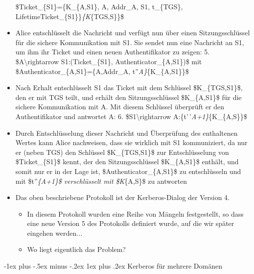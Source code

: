 \documentclass[a4paper]{article}
\makeatletter
\renewcommand{\subsubsection}{\@startsection{subsubsection}{3}{0mm}%
 {-1ex plus -.5ex minus -.2ex}%
 {1ex plus .2ex}%
 {\normalfont\small\bfseries}}
\makeatother
\begin{document}
\begin{multicols}{3}
\begin{itemize}
              \$Ticket\_\{S1\}=\{K\_\{A,S1\}, A, Addr\_A, S1, t\_\{TGS\},
              LifetimeTicket\_\{S1\}\}\emph{\{K}\{TGS,S\}\}\$
        \item
              Alice entschlüsselt die Nachricht und verfügt nun über einen
              Sitzungsschlüssel für die sichere Kommunikation mit S1. Sie sendet nun
              eine Nachricht an S1, um ihm ihr Ticket und einen neuen
              Authentifikator zu zeigen: 5. \$A\textbackslash rightarrow
              S1:(Ticket\_\{S1\}, Authenticator\_\{A,S1\})\$ mit
              \$Authenticator\_\{A,S1\}=\{A,Addr\_A, t''\emph{A\}}\{K\_\{A,S1\}\}\$
        \item
              Nach Erhalt entschlüsselt S1 das Ticket mit dem Schlüssel
              \$K\_\{TGS,S1\}\$, den er mit TGS teilt, und erhält den
              Sitzungsschlüssel \$K\_\{A,S1\}\$ für die sichere Kommunikation mit A.
              Mit diesem Schlüssel überprüft er den Authentifikator und antwortet A:
              6. \$S1\textbackslash rightarrow A:\{t'\,'\emph{A+1\}}\{K\_\{A,S\}\}\$
        \item
              Durch Entschlüsselung dieser Nachricht und Überprüfung des enthaltenen
              Wertes kann Alice nachweisen, dass sie wirklich mit S1 kommuniziert,
              da nur er (neben TGS) den Schlüssel \$K\_\{TGS,S1\}\$ zur
              Entschlüsselung von \$Ticket\_\{S1\}\$ kennt, der den
              Sitzungsschlüssel \$K\_\{A,S1\}\$ enthält, und somit nur er in der
              Lage ist, \$Authenticator\_\{A,S1\}\$ zu entschlüsseln und mit
              \$t''\emph{\{A+1\}\$ verschlüsselt mit \$K}\{A,S\}\$ zu antworten
        \item
              Das oben beschriebene Protokoll ist der Kerberos-Dialog der Version 4.

              \begin{itemize}
                  \item
                        In diesem Protokoll wurden eine Reihe von Mängeln festgestellt, so
                        dass eine neue Version 5 des Protokolls definiert wurde, auf die wir
                        später eingehen werden...
                  \item
                        Wo liegt eigentlich das Problem?
              \end{itemize}
    \end{itemize}


    \subsubsection{Kerberos für mehrere
        Domänen}


\end{multicols}
\end{document}
